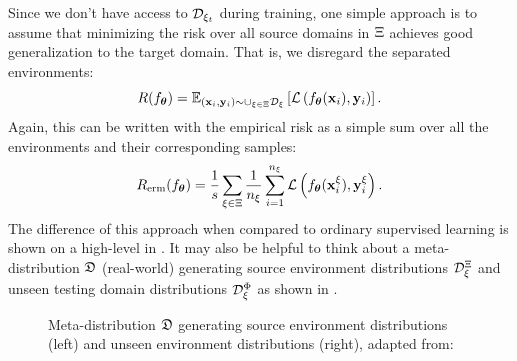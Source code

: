 Since we don't have access to $\mathcal{D}_{\xi_{t}}$ during training, one simple approach is to assume that minimizing the risk over all source domains in $\Xi$ achieves good generalization to the target domain. That is, we disregard the separated environments:
\begin{equation}
\label{eq:erm}
    R(f_{\boldsymbol{\theta}}) = \mathbb{E}_{(\mathbf{x}_i, \mathbf{y}_i) \sim \cup_{\xi \in \Xi} \mathcal{D}_\xi} \left[\mathcal{L}\left(f_{\boldsymbol{\theta}}(\mathbf{x}_i), \mathbf{y}_i\right) \right].
\end{equation}
Again, this can be written with the empirical risk as a simple sum over all the environments and their corresponding samples:
\begin{equation}
\label{eq:domain_risk_emp}
    R_{\mathrm{erm}}(f_{\boldsymbol{\theta}}) = \frac{1}{s} \sum_{\xi \in \Xi} \frac{1}{n_\xi} \sum_{i=1}^{n_\xi} \mathcal{L}\left(f_{\boldsymbol{\theta}}(\mathbf{x}_i^{\xi}), \mathbf{y}_i^{\xi}\right).
\end{equation}
The difference of this approach when compared to ordinary supervised learning is shown on a high-level in . It may also be helpful to think about a meta-distribution $\meta$ (real-world) generating source environment distributions $\mathcal{D}_\xi^\Xi$ and unseen testing domain distributions $\mathcal{D}_\xi^\Phi$ as shown in .
\begin{figure}[htbp]
    \centering
    \caption[Meta-distribution $\meta$ generating source and unseen domain distributions]{Meta-distribution $\meta$ generating source environment distributions (left) and unseen environment distributions (right), adapted from: \citep{albuquerque2019generalizing}}
    \label{fig:meta_domain}
\end{figure}

